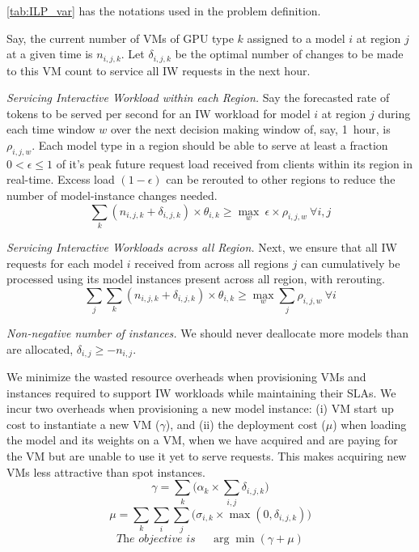 \autoref{tab:ILP_var} has the notations used in the problem definition.

Say, the current number of VMs of GPU type $k$ assigned to a model $i$ at region $j$ at a given time is $n_{i,j, k}$. Let $\delta_{i, j, k}$ be the optimal number of changes to be made to this VM count to service all IW requests in the next hour.

\textit{Servicing Interactive Workload within each Region.} 
Say the forecasted rate of tokens to be served per second for an IW workload for model $i$ at region $j$ during each time window $w$  over the next decision making window of, say, 1~hour, is $\rho_{i,j,w}$.
Each model type in a region should be able to serve at least a fraction $0 < \epsilon \leq 1$ of it's peak future request load received from clients within its region in real-time. Excess load $(1-\epsilon)$ can be rerouted to other regions to reduce the number of model-instance changes needed.
\[ \sum_k (n_{i,j, k} + \delta_{i, j, k}) \times \theta_{i,k} \geq \max_{w}{\ \epsilon \times \rho_{i,j,w}} \ \forall i, j \]

\textit{Servicing Interactive Workloads across all Region.} 
Next, we ensure that all IW requests for each model $i$ received from across all regions $j$ can cumulatively be processed using its model instances present across all region, with rerouting.
\[\sum_{j} \sum_k (n_{i, j, k} + \delta_{i, j, k}) \times \theta_{i, k}\geq\max_{w}\sum_{j}\rho_{i,j,w} \ \forall i\]

\textit{Non-negative number of instances.} We should never deallocate more models than are allocated, $\delta_{i, j} \geq -n_{i, j}$.


 We minimize the wasted resource overheads when provisioning VMs and instances required to support IW workloads while maintaining their SLAs. We incur two overheads when provisioning a new model instance: (i) VM start up cost to instantiate a new VM ($\gamma$), and (ii) the deployment cost ($\mu$) when loading the model and its weights on a VM, when we have acquired and are paying for the VM but are unable to use it yet to serve requests. This makes acquiring new VMs less attractive than spot instances. 
\[ \gamma = \sum_{k}\Big(\alpha_{k} \times \sum_{i, j} \delta_{i, j, k} \Big) \]
\[ \mu = \sum_{k}\sum_{i}\sum_{j}\big(\sigma_{i, k} \times \max(0, \delta_{i, j, k}) \big) \]
\[ \textit{The objective is~~~~} \arg \min (\gamma + \mu)\]


